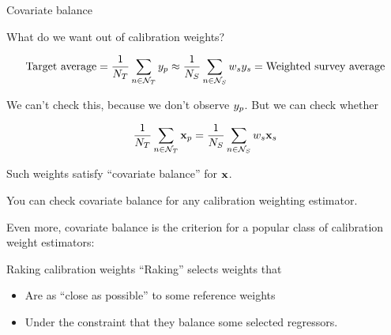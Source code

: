 
\begin{frame}[t]{Covariate balance}

What do we want out of calibration weights?

$$
\textrm{Target average} =
\frac{1}{N_{T}} \sum_{n \in \mathcal{N}_{T}} y_p \approx \frac{1}{N_{S}} \sum_{n \in \mathcal{N}_{S}} w_s y_s
= \textrm{Weighted survey average}
$$

We can't check this, because we don't observe $y_p$.  But we can check
whether

$$
    \frac{1}{N_{T}} \sum_{n \in \mathcal{N}_{T}} \mathbf{x}_p = \frac{1}{N_{S}} \sum_{n \in \mathcal{N}_{S}} w_s \mathbf{x}_s
$$

Such weights satisfy ``covariate balance'' for $\mathbf{x}$.

You can check covariate balance for any calibration weighting estimator.

Even more, covariate balance is the criterion for a popular class of calibration
weight estimators:

\begin{block}{Raking calibration weights}
``Raking'' selects weights that
%
\begin{itemize}
    \item Are as ``close as possible'' to some reference weights
    \item Under the constraint that they balance some selected regressors.
\end{itemize}
%
\end{block}



\end{frame}





